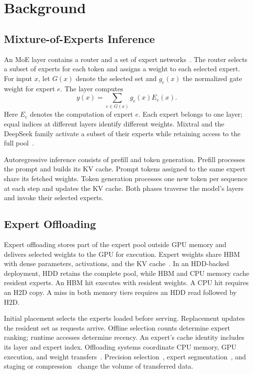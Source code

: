 \section{Background}
\label{sec:background}
\subsection{Mixture-of-Experts Inference}
An MoE layer contains a router and a set of expert networks~\cite{shazeer,switch,gshard}.
The router selects a subset of experts for each token and assigns a weight to each selected expert.
For input $x$, let $G(x)$ denote the selected set and $g_e(x)$ the normalized gate weight for expert $e$.
The layer computes
\begin{equation}
y(x)=\sum_{e\in G(x)}g_e(x)E_e(x).
\end{equation}
Here $E_e$ denotes the computation of expert $e$.
Each expert belongs to one layer; equal indices at different layers identify different weights.
Mixtral and the DeepSeek family activate a subset of their experts while retaining access to the full pool~\cite{mixtral,deepseekmoe,deepseekv2,deepseekv3,mixtral22}.

Autoregressive inference consists of prefill and token generation.
Prefill processes the prompt and builds its KV cache.
Prompt tokens assigned to the same expert share its fetched weights.
Token generation processes one new token per sequence at each step and updates the KV cache.
Both phases traverse the model's layers and invoke their selected experts.

\subsection{Expert Offloading}
Expert offloading stores part of the expert pool outside GPU memory and delivers selected weights to the GPU for execution.
Expert weights share HBM with dense parameters, activations, and the KV cache~\cite{pagedattention,sglang}.
In an HDD-backed deployment, HDD retains the complete pool, while HBM and CPU memory cache resident experts.
An HBM hit executes with resident weights.
A CPU hit requires an H2D copy.
A miss in both memory tiers requires an HDD read followed by H2D.

Initial placement selects the experts loaded before serving.
Replacement updates the resident set as requests arrive.
Offline selection counts determine expert ranking; runtime accesses determine recency.
An expert's cache identity includes its layer and expert index.
Offloading systems coordinate CPU memory, GPU execution, and weight transfers~\cite{flexgen,dsinference,zeroinfinity,llmflash,powerinfer,hetegen}.
Precision selection~\cite{hobbit,specter}, expert segmentation~\cite{moepic,slicemoe}, and staging or compression~\cite{mira,zipmoe} change the volume of transferred data.
